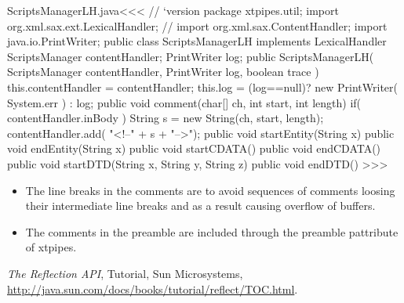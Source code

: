 \documentclass{article}
\begin{document}
\<ScriptsManagerLH.java\><<<
// `version
package xtpipes.util;
import org.xml.sax.ext.LexicalHandler;
// import org.xml.sax.ContentHandler;     
import java.io.PrintWriter;
public class ScriptsManagerLH implements LexicalHandler {
       ScriptsManager contentHandler;
       PrintWriter log;
   public ScriptsManagerLH( ScriptsManager contentHandler,
                          PrintWriter log, boolean trace ){
     this.contentHandler = contentHandler;
     this.log = (log==null)? new PrintWriter( System.err ) : log;
   }
   public void comment(char[] ch, int start, int length){
     if( contentHandler.inBody ){
        String s = new String(ch, start, length);
        contentHandler.add(  "<!--" + s + "\n-->");
   } }
   public void startEntity(String x){}
   public void endEntity(String x){}
   public void startCDATA(){}
   public void endCDATA(){}
   public void startDTD(String x, String y, String z){}
   public void endDTD(){} 
}
>>>

\begin{itemize}
\item
The line breaks in the comments are to avoid sequences of comments 
loosing their intermediate line breaks and as a result causing 
overflow of buffers.

\item The comments in the preamble are included through the 
preamble pattribute of xtpipes.
\end{itemize}











\begin{thebibliography}{10}
{\sl The Reflection API},
Tutorial, Sun Microsystems,
\url{http://java.sun.com/docs/books/tutorial/reflect/TOC.html}.
\end{thebibliography}





{ 
}
{ 
}
\end{document}

